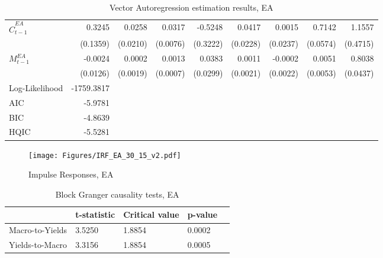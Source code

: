 \begin{sidewaystable}
\begin{tabular}{lrrrrrrrr}
        $\hat{C}^{EA}_{t-1}$          &  0.3245 &   0.0258 &      0.0317 & -0.5248 &  0.0417 &  0.0015 &  0.7142 &    1.1557 \\
               &  (0.1359) &   (0.0210) &      (0.0076) &  (0.3222) &  (0.0228) &  (0.0237) &  (0.0574) &    (0.4715) \\
        $M^{EA}_{t-1}$      & -0.0024 &   0.0002 &      0.0013 &  0.0383 &  0.0011 & -0.0002 &  0.0051 &    0.8038 \\
           &  (0.0126) &   (0.0019) &      (0.0007) &  (0.0299) &  (0.0021) &  (0.0022) &  (0.0053) &    (0.0437) \\
    \midrule
    Log-Likelihood & -1759.3817 \\
    AIC            &    -5.9781 \\
    BIC            &    -4.8639 \\
    HQIC           &    -5.5281 \\
    \bottomrule
    \end{tabular}
    \caption{Vector Autoregression estimation results, EA}
    \label{tab:VAR_output_EA}
\end{sidewaystable}


\begin{sidewaysfigure}
    \centering
    \texttt{[image: Figures/IRF\_EA\_30\_15\_v2.pdf]}
    \caption{Impulse Responses, EA}
    \label{fig:IRF_EA}
\end{sidewaysfigure}

\begin{table}[!t]
    \centering
    \begin{tabular}{lllll}
    \toprule
    {} &     t-statistic &      Critical value &                 p-value 
    \\
    \midrule
    Macro-to-Yields &  3.5250 &  1.8854 &  0.0002 &  \\
    Yields-to-Macro &   3.3156 &  1.8854 &  0.0005  \\
\bottomrule
    \end{tabular}
    \caption{Block Granger causality tests, EA}
    \label{tab:granger_ea}
\end{table}









